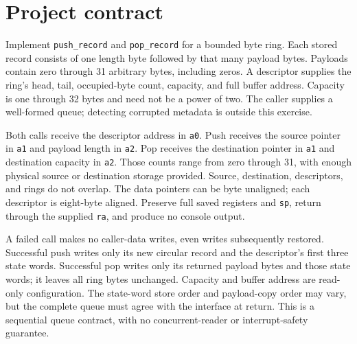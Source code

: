 \section*{Project contract}
Implement \texttt{push\_record} and \texttt{pop\_record} for a bounded byte ring.
Each stored record consists of one length byte followed by that many payload bytes.
Payloads contain zero through 31 arbitrary bytes, including zeros. A descriptor
supplies the ring's head, tail, occupied-byte count, capacity, and full buffer address.
Capacity is one through 32 bytes and need not be a power of two. The caller supplies
a well-formed queue; detecting corrupted metadata is outside this exercise.

Both calls receive the descriptor address in \texttt{a0}. Push receives the source
pointer in \texttt{a1} and payload length in \texttt{a2}. Pop receives the destination
pointer in \texttt{a1} and destination capacity in \texttt{a2}. Those counts range
from zero through 31, with enough physical source or destination storage provided.
Source, destination, descriptors, and rings do not overlap. The data pointers can
be byte unaligned; each descriptor is eight-byte aligned. Preserve full saved
registers and \texttt{sp}, return through the supplied \texttt{ra}, and produce no
console output.

A failed call makes no caller-data writes, even writes subsequently restored.
Successful push writes only its new circular record and the descriptor's first
three state words. Successful pop writes only its returned payload bytes and those
state words; it leaves all ring bytes unchanged. Capacity and buffer address are
read-only configuration. The state-word store order and payload-copy order may vary,
but the complete queue must agree with the interface at return. This is a sequential
queue contract, with no concurrent-reader or interrupt-safety guarantee.
